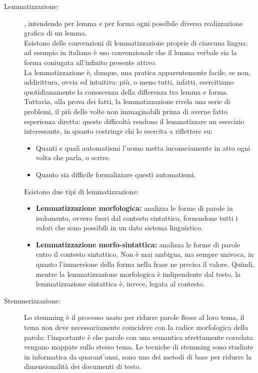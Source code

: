 \documentclass{article}
\theoremstyle{plain}
\theoremstyle{definition}
\begin{document}
\begin{description}
\item [Lemmatizzazione:] , intendendo per lemma  e per forma ogni possibile diversa realizzazione grafica di un lemma.\footnotemark
{}
\\
Esistono delle convenzioni di lemmatizzazione proprie di ciascuna lingua: ad esempio in italiano è uso convenzionale che il lemma verbale sia la forma coniugata all'infinito presente attivo.
\\
La lemmatizzazione è, dunque, una pratica apparentemente facile, se non, addirittura, ovvia ed intuitiva: più, o meno tutti, infatti, esercitiamo quotidianamente la conoscenza della differenza tra lemma e forma. Tuttavia, alla prova dei fatti, la lemmatizzazione rivela una serie di problemi, il più delle volte non immaginabili prima di averne fatto esperienza diretta: queste difficoltà rendono il lemmatizzare un esercizio interessante, in quanto costringe chi lo esercita a riflettere su:

\begin{itemize}  
\item Quanti e quali automatismi l'uomo metta inconsciamente in atto ogni volta che parla, o scrive.
\item Quanto sia difficile formalizzare questi automatismi.
\end{itemize}

Esistono due tipi di lemmatizzazione:

\begin{itemize}  
\item \textbf{Lemmatizzazione morfologica:} analizza le forme di parole in isolamento, ovvero fuori dal contesto sintattico, fornendone tutti i valori che sono possibili in un dato sistema linguistico.
\item \textbf{Lemmatizzazione morfo-sintattica:} analizza le forme di parole entro il contesto sintattico. Non è mai ambigua, ma sempre univoca, in quanto l'immersione della forma nella frase ne precisa il valore. Quindi, mentre la lemmatizzazione morfologica è indipendente dal testo, la lemmatizzazione sintattica è, invece, legata al contesto.
\end{itemize}
  
\item [Stemmerizzazione:]Lo stemming è il processo usato per ridurre parole flesse al loro tema, il tema non deve necessariamente coincidere con la radice morfologica della parola: l'importante è che parole con una semantica strettamente correlata vengano mappate sullo stesso tema. Le tecniche di stemming sono studiate in informatica da quarant'anni, sono uno dei metodi di base per ridurre la dimensionalità dei documenti di testo.
\end{description}
\end{document}
